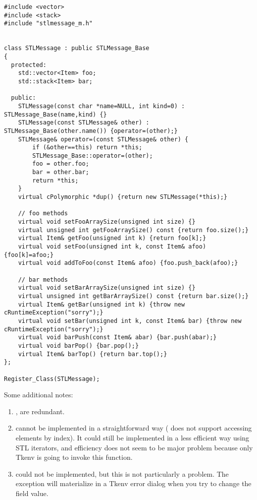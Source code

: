 \begin{verbatim}
#include <vector>
#include <stack>
#include "stlmessage_m.h"


class STLMessage : public STLMessage_Base
{
  protected:
    std::vector<Item> foo;
    std::stack<Item> bar;

  public:
    STLMessage(const char *name=NULL, int kind=0) : STLMessage_Base(name,kind) {}
    STLMessage(const STLMessage& other) : STLMessage_Base(other.name()) {operator=(other);}
    STLMessage& operator=(const STLMessage& other) {
        if (&other==this) return *this;
        STLMessage_Base::operator=(other);
        foo = other.foo;
        bar = other.bar;
        return *this;
    }
    virtual cPolymorphic *dup() {return new STLMessage(*this);}

    // foo methods
    virtual void setFooArraySize(unsigned int size) {}
    virtual unsigned int getFooArraySize() const {return foo.size();}
    virtual Item& getFoo(unsigned int k) {return foo[k];}
    virtual void setFoo(unsigned int k, const Item& afoo) {foo[k]=afoo;}
    virtual void addToFoo(const Item& afoo) {foo.push_back(afoo);}

    // bar methods
    virtual void setBarArraySize(unsigned int size) {}
    virtual unsigned int getBarArraySize() const {return bar.size();}
    virtual Item& getBar(unsigned int k) {throw new cRuntimeException("sorry");}
    virtual void setBar(unsigned int k, const Item& bar) {throw new cRuntimeException("sorry");}
    virtual void barPush(const Item& abar) {bar.push(abar);}
    virtual void barPop() {bar.pop();}
    virtual Item& barTop() {return bar.top();}
};

Register_Class(STLMessage);
\end{verbatim}

Some additional notes:

\begin{enumerate}
  \item{,  are redundant.}
  \item{ cannot be implemented in a straightforward way
     ( does not support accessing elements by index).
     It could still be implemented in a less efficient way using STL iterators,
     and efficiency does not seem to be major problem because only Tkenv
     is going to invoke this function.}
  \item{ could not be implemented, but this
     is not particularly a problem. The exception will materialize in a
     Tkenv error dialog when you try to change the field value.}
\end{enumerate}

